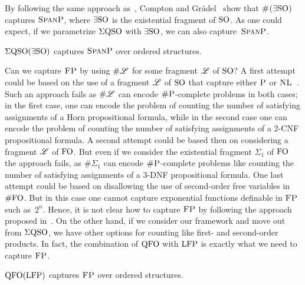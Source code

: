 By following the same approach as~\cite{SalujaST95}, Compton and Gr\"adel~\cite{ComptonG96} show that $\text{\sc \#($\exists{\rm SO}$)}$ captures $\text{\sc SpanP}$, where $\exists{\rm SO}$ is the existential fragment of ${\rm SO}$. As one could expect, if we parametrize $\Sigma{\rm QSO}$ with $\exists{\rm SO}$, we can also capture~$\text{\sc SpanP}$.
\begin{proposition} \label{prop:capture-spanP}
	$\Sigma{\rm QSO}(\exists{\rm SO})$ captures $\text{\sc SpanP}$ over ordered structures.
\end{proposition}
Can we capture $\text{\sc FP}$ by using $\# \mathscr{L}$ for some fragment $\mathscr{L}$ of ${\rm SO}$? A first attempt could be based on the use of a fragment $\mathscr{L}$ of ${\rm SO}$ that capture either $\text{\sc P}$ or $\text{\sc NL}$~\cite{G92}. Such an approach fails as $\# \mathscr{L}$ can encode $\text{\sc \#P}$-complete problems in both cases; in the first case, one can encode the problem of counting the number of satisfying assignments of a Horn  propositional formula, while in the second case one can encode the problem of counting the number of satisfying assignments of a 2-CNF propositional formula. A second attempt could be based then on considering a fragment $\mathscr{L}$ of ${\rm FO}$. 
But even if we consider the existential fragment $\Sigma_1$ of ${\rm FO}$ the approach fails, as $\# \Sigma_1$ can encode $\text{\sc \#P}$-complete problems like counting the number of satisfying assignments of a 3-DNF propositional formula\cite{SalujaST95}. One last attempt could be based on disallowing the use of second-order free variables in $\#{\rm FO}$. But in this case one 
cannot capture exponential functions definable in $\text{\sc FP}$ such as~$2^n$.
Hence, it is not  clear how to capture
$\text{\sc FP}$ 
by following the approach proposed in~\cite{SalujaST95}. 
On the other hand, if we consider our framework and move out from $\Sigma{\rm QSO}$, we have other options for counting like first- and second-order products. In fact, the combination of ${\rm QFO}$ with ${\rm LFP}$ is exactly what we need to capture $\text{\sc FP}$.
\begin{theorem} \label{theo:capture-fp}
	${\rm QFO}({\rm LFP})$ captures $\text{\sc FP}$ over ordered structures.
\end{theorem}
